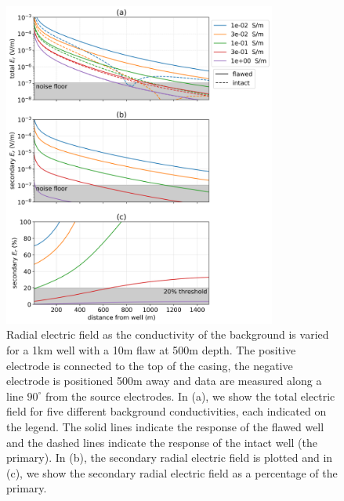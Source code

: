 \begin{figure}
    \begin{center}
    \includegraphics[width=0.8\textwidth]{figures/dc_casing/integrity_conductivity.png}
    \end{center}
\caption{
    Radial electric field as the conductivity of the background is varied for a 1km well with a 10m flaw at 500m depth.
    The positive electrode is connected to the top of the casing, the negative electrode
    is positioned 500m away and data are measured along a line $90^\circ$ from the
    source electrodes. In (a), we show the total electric field for five different background conductivities,
    each indicated on the legend. The solid lines indicate the response of the flawed well and the dashed lines indicate the response of the intact well (the primary).
    In (b), the secondary radial electric field is plotted and in (c), we show the
    secondary radial electric field as a percentage of the primary.
}
\label{fig:integrity_conductivity}
\end{figure}
